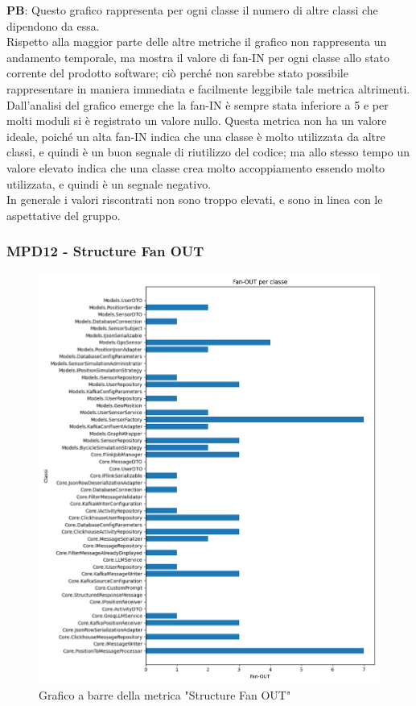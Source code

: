 \documentclass[10pt]{article}
\begin{document}
\begin{justify}
\textbf{PB}: Questo grafico rappresenta per ogni classe il numero di altre classi che dipendono da essa.\\
Rispetto alla maggior parte delle altre metriche il grafico non rappresenta un andamento temporale, ma mostra il valore di fan-IN per ogni classe allo stato 
corrente del prodotto software; ciò perché non sarebbe stato possibile rappresentare in maniera immediata e  facilmente leggibile tale metrica altrimenti.\\
Dall'analisi del grafico emerge che la fan-IN è sempre stata inferiore a 5 e per molti moduli si è registrato un valore nullo. Questa metrica non ha un valore ideale,
poiché un alta fan-IN indica che una classe è molto utilizzata da altre classi, e quindi è un buon segnale di riutilizzo del codice; ma allo stesso tempo un valore 
elevato indica che una classe crea molto accoppiamento essendo molto utilizzata, e quindi è un segnale negativo.\\ In generale i valori riscontrati non sono troppo 
elevati, e sono in linea con le aspettative del gruppo.\\


\subsubsection{MPD12 - Structure Fan OUT}

\begin{figure}[H]
  \centering
  \includegraphics[width=0.9\linewidth]{metrics_fan_out.png}
  \caption{Grafico a barre della metrica "Structure Fan OUT"}
\end{figure}


\end{justify}
\end{document}
